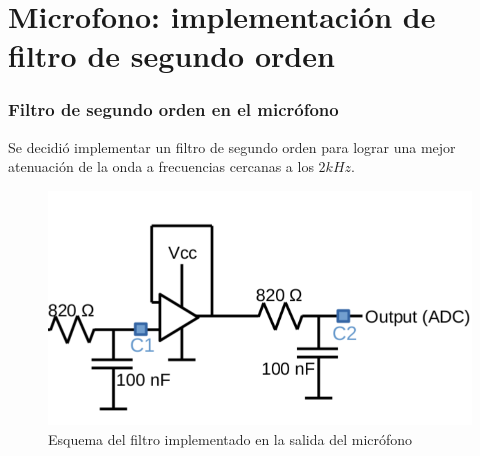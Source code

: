 \section{Microfono: implementación de filtro de segundo orden}
\begin{frame}
\frametitle{Filtro de segundo orden en el micrófono}
Se decidió implementar un filtro de segundo orden para lograr una mejor atenuación de la onda a frecuencias cercanas a los $2kHz$.
\begin{figure}[H]
			\centering
			\includegraphics[scale=0.3]{esqfiltro}
			\caption{Esquema del filtro implementado en la salida del micrófono}	
		\end{figure}
\end{frame}



